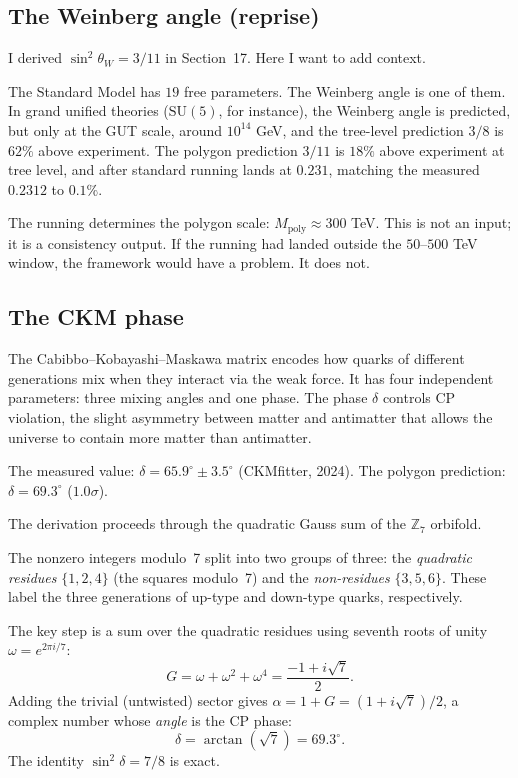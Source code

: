 \medskip

\subsection*{The Weinberg angle (reprise)}

I derived $\sin^2\theta_W = 3/11$ in Section~17. Here I want to add
context.

The Standard Model has $19$ free parameters. The Weinberg angle is
one of them. In grand unified theories ($\mathrm{SU}(5)$, for
instance), the Weinberg angle is predicted, but only at the GUT
scale, around $10^{14}$ GeV, and the tree-level prediction $3/8$ is
$62\%$ above experiment. The polygon prediction $3/11$ is $18\%$
above experiment at tree level, and after standard running lands at
$0.231$, matching the measured $0.2312$ to $0.1\%$.

The running determines the polygon scale: $M_{\text{poly}} \approx 300$
TeV. This is not an input; it is a consistency output. If the running
had landed outside the $50$--$500$ TeV window, the framework would
have a problem. It does not.

\subsection*{The CKM phase}

The Cabibbo--Kobayashi--Maskawa matrix encodes how quarks of different
generations mix when they interact via the weak force. It has four
independent parameters: three mixing angles and one phase. The phase
$\delta$ controls CP violation, the slight asymmetry between matter
and antimatter that allows the universe to contain more matter than
antimatter.

The measured value: $\delta = 65.9^\circ \pm 3.5^\circ$ (CKMfitter,
2024). The polygon prediction: $\delta = 69.3^\circ$ ($1.0\sigma$).

The derivation proceeds through the quadratic Gauss sum of
the $\mathbb{Z}_7$ orbifold.

The nonzero integers modulo~7 split into two groups of three:
the \emph{quadratic residues} $\{1, 2, 4\}$ (the squares modulo~7)
and the \emph{non-residues} $\{3, 5, 6\}$.
These label the three generations of up-type and down-type quarks,
respectively.

The key step is a sum over the quadratic residues using seventh
roots of unity $\omega = e^{2\pi i/7}$:
\[
  G = \omega + \omega^2 + \omega^4 = \frac{-1 + i\sqrt{7}}{2}.
\]
Adding the trivial (untwisted) sector gives
$\alpha = 1 + G = (1 + i\sqrt{7})/2$,
a complex number whose \emph{angle} is the CP phase:
\[
  \delta = \arctan(\sqrt{7}) = 69.3^\circ.
\]
The identity $\sin^2\!\delta = 7/8$ is exact.

